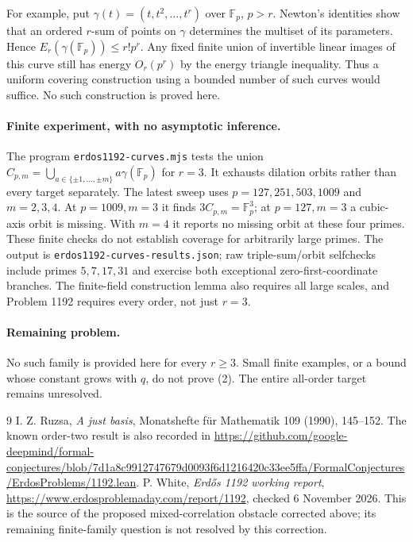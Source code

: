 \documentclass[11pt]{article}
\begin{document}
For example, put $\gamma(t)=(t,t^2,\ldots,t^r)$ over $\mathbb F_p$, $p>r$.
Newton's identities show that an ordered $r$-sum of points on $\gamma$
determines the multiset of its parameters. Hence
$E_r(\gamma(\mathbb F_p))\le r!p^r$. Any fixed finite union of invertible
linear images of this curve still has energy $O_r(p^r)$ by the energy
triangle inequality. Thus a uniform covering construction using a bounded
number of such curves would suffice. No such construction is proved here.

\paragraph{Finite experiment, with no asymptotic inference.}
The program \texttt{erdos1192-curves.mjs} tests the union
$C_{p,m}=\bigcup_{a\in\{\pm1,\ldots,\pm m\}}a\gamma(\mathbb F_p)$ for $r=3$.
It exhausts dilation orbits rather than every target separately. The latest
sweep uses $p=127,251,503,1009$ and $m=2,3,4$.
At $p=1009,m=3$ it finds $3C_{p,m}=\mathbb F_p^3$; at $p=127,m=3$ a cubic-axis
orbit is missing. With $m=4$ it reports no missing orbit at these four primes.
These finite checks do not establish coverage for arbitrarily large primes.
The output is \texttt{erdos1192-curves-results.json}; raw triple-sum/orbit
selfchecks include primes $5,7,17,31$ and exercise both exceptional zero-first-coordinate
branches. The finite-field construction lemma also requires all large scales,
and Problem 1192 requires every order, not just $r=3$.

\paragraph{Remaining problem.}
No such family is provided here for every $r\ge3$. Small finite examples,
or a bound whose constant grows with $q$, do not prove (2).
The entire all-order target remains unresolved.

\begin{thebibliography}{9}
 I. Z. Ruzsa, \emph{A just basis}, Monatshefte f\"ur Mathematik
109 (1990), 145--152. The known order-two result is also recorded in
\url{https://github.com/google-deepmind/formal-conjectures/blob/7d1a8c9912747679d0093f6d1216420c33ee5ffa/FormalConjectures/ErdosProblems/1192.lean}.
 P. White, \emph{Erd\H{o}s 1192 working report},
\url{https://www.erdosproblemaday.com/report/1192}, checked 6 November 2026.
This is the source of the proposed mixed-correlation obstacle corrected above;
its remaining finite-family question is not resolved by this correction.
\end{thebibliography}
\end{document}
